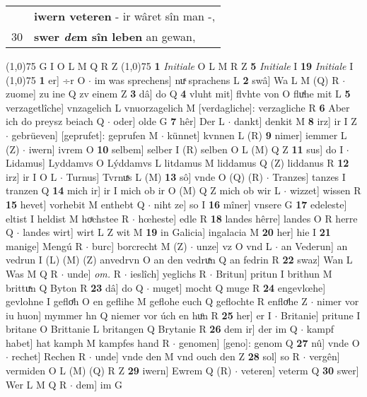 \documentclass[8pt,a4paper,notitlepage]{article}
\begin{document}
\begin{table}[ht]
\begin{minipage}[t]{0.5\linewidth}
\begin{tabular}{rl}
 & \textbf{iwern veteren} - ir wâret sîn man -,\\ 
30 & \textbf{swer \textit{de}m sîn leben} an gewan,\\ 
\end{tabular}
\scriptsize
\line(1,0){75} \newline
G I O L M Q R Z \newline
\line(1,0){75} \newline
\textbf{1} \textit{Initiale} O L M R Z  \textbf{5} \textit{Initiale} I  \textbf{19} \textit{Initiale} I  \newline
\line(1,0){75} \newline
\textbf{1} er] ÷r O  $\cdot$ im was sprechens] nuͯ sprachens L \textbf{2} swâ] Wa L M (Q) R  $\cdot$ zuome] zu ine Q zv einem Z \textbf{3} dâ] do Q \textbf{4} vluht mit] flvhte von O fluͯhe mit L \textbf{5} verzagetlîche] vnzagelich L vnuorzagelich M [verdagliche]: verzagliche R \textbf{6} Aber ich do preysz beiach Q  $\cdot$ oder] olde G \textbf{7} hêr] Der L  $\cdot$ dankt] denkit M \textbf{8} irz] ir I Z  $\cdot$ gebrüeven] [geprufet]: geprufen M  $\cdot$ künnet] kvnnen L (R) \textbf{9} nimer] iemmer L (Z)  $\cdot$ iwern] ivrem O \textbf{10} selbem] selber I (R) selben O L (M) Q Z \textbf{11} sus] do I  $\cdot$ Lidamus] Lyddamvs O Lýddamvs L litdamus M liddamus Q (Z) liddanus R \textbf{12} irz] ir I O L  $\cdot$ Turnus] Tvrnuͯs L (M) \textbf{13} sô] vnde O (Q) (R)  $\cdot$ Tranzes] tanzes I tranzen Q \textbf{14} mich ir] ir I mich ob ir O (M) Q Z mich ob wir L  $\cdot$ wizzet] wissen R \textbf{15} hevet] vorhebit M enthebt Q  $\cdot$ niht ze] so I \textbf{16} mîner] vnsere G \textbf{17} edeleste] eltist I heldist M hoͯchstee R  $\cdot$ hœheste] edle R \textbf{18} landes hêrre] landes O R herre Q  $\cdot$ landes wirt] wirt L Z wit M \textbf{19} in Galicia] ingalacia M \textbf{20} her] hie I \textbf{21} manige] Mengú R  $\cdot$ burc] borcrecht M (Z)  $\cdot$ unze] vz O vnd L  $\cdot$ an Vederun] an vedrun I (L) (M) (Z) anvedrvn O an den vedruͯn Q an fedrin R \textbf{22} swaz] Wan L Was M Q R  $\cdot$ unde] \textit{om.} R  $\cdot$ ieslîch] yeglichs R  $\cdot$ Britun] pritun I brithun M brittuͯn Q Byton R \textbf{23} dâ] do Q  $\cdot$ muget] mocht Q muge R \textbf{24} engevlœhe] gevlohne I gefloͤh O en geflihe M geflohe euch Q geflochte R enfloͤhe Z  $\cdot$ nimer vor iu huon] mymmer hn Q niemer vor úch en huͦn R \textbf{25} her] er I  $\cdot$ Britanie] pritune I britane O Brittanie L britangen Q Brytanie R \textbf{26} dem ir] der im Q  $\cdot$ kampf habet] hat kamph M kampfes hand R  $\cdot$ genomen] [geno]: genom Q \textbf{27} nû] vnde O  $\cdot$ rechet] Rechen R  $\cdot$ unde] vnde den M vnd ouch den Z \textbf{28} sol] so R  $\cdot$ vergên] vermiden O L (M) (Q) R Z \textbf{29} iwern] Ewrem Q (R)  $\cdot$ veteren] veterm Q \textbf{30} swer] Wer L M Q R  $\cdot$ dem] im G \newline

\end{minipage}
\end{table}
\end{document}
